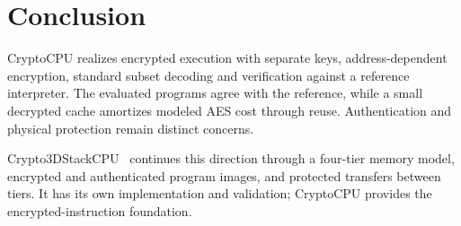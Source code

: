 \documentclass[conference,a4paper]{IEEEtran}
\begin{document}
\section{Conclusion}
CryptoCPU realizes encrypted execution with separate keys, address-dependent
encryption, standard subset decoding and verification against a reference
interpreter. The evaluated programs agree with the reference, while a small
decrypted cache amortizes modeled AES cost through reuse. Authentication and
physical protection remain distinct concerns.

Crypto3DStackCPU~\cite{crypto3d} continues this direction
through a four-tier memory model, encrypted and authenticated program images,
and protected transfers between tiers. It has its own implementation and
validation; CryptoCPU provides the encrypted-instruction foundation.



\end{document}
